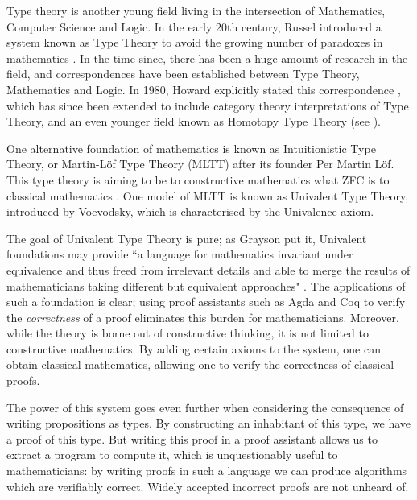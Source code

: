 \documentclass[ProjectReport]{subfiles}
\begin{document}
Type theory is another young field living in the intersection of Mathematics, Computer Science and Logic. In the early 20th century, Russel introduced a system known as Type Theory to avoid the growing number of paradoxes in mathematics \cite{coquand_type_2018}. In the time since, there has been a huge amount of research in the field, and correspondences have been established between Type Theory, Mathematics and Logic. In 1980, Howard explicitly stated this correspondence \cite{Howard1980-HOWTFN-2}, which has since been extended to include category theory interpretations of Type Theory, and an even younger field known as Homotopy Type Theory (see \cite{hottbook}). 

One alternative foundation of mathematics is known as Intuitionistic Type Theory, or Martin-L\"{o}f Type Theory (MLTT) after its founder Per Martin L\"{o}f. This type theory is aiming to be to constructive mathematics what ZFC is to classical mathematics \cite{dybjer_intuitionistic_2020}. One model of MLTT is known as Univalent Type Theory, introduced by Voevodsky, which is characterised by the Univalence axiom. 

The goal of Univalent Type Theory is pure; as Grayson put it, Univalent foundations may provide ``a language for mathematics invariant under equivalence and thus freed from irrelevant details and able to merge the results of mathematicians taking different but equivalent approaches" \cite{grayson_introduction_2018}. The applications of such a foundation is clear; using proof assistants such as Agda and Coq to verify the \textit{correctness} of a proof eliminates this burden for mathematicians. Moreover, while the theory is borne out of constructive thinking, it is not limited to constructive mathematics. By adding certain axioms to the system, one can obtain classical mathematics, allowing one to verify the correctness of classical proofs. 

The power of this system goes even further when considering the consequence of writing propositions as types. By constructing an inhabitant of this type, we have a proof of this type. But writing this proof in a proof assistant allows us to extract a program to compute it, which is unquestionably useful to mathematicians: by writing proofs in such a language we can produce algorithms which are verifiably correct. Widely accepted incorrect proofs \cite{Incorrect_Proofs} are not unheard of.
\end{document}
